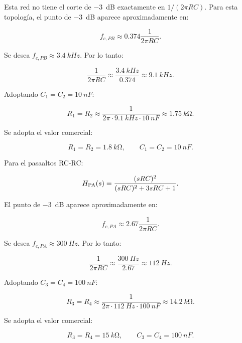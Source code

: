 Esta red no tiene el corte de \SI{-3}{dB} exactamente en $1/(2\pi RC)$. Para esta topología, el punto de \SI{-3}{dB} aparece aproximadamente en:

\begin{equation}
    f_{c,PB}\approx 0.374\frac{1}{2\pi RC}.
\end{equation}

Se desea $f_{c,PB}\approx\SI{3.4}{kHz}$. Por lo tanto:

\begin{equation}
    \frac{1}{2\pi RC}\approx\frac{\SI{3.4}{kHz}}{0.374}\approx\SI{9.1}{kHz}.
\end{equation}

Adoptando $C_1=C_2=\SI{10}{nF}$:

\begin{equation}
    R_1=R_2\approx\frac{1}{2\pi\cdot \SI{9.1}{kHz}\cdot \SI{10}{nF}}\approx\SI{1.75}{k\ohm}.
\end{equation}

Se adopta el valor comercial:

\begin{equation}
    \boxed{R_1=R_2=\SI{1.8}{k\ohm}},
    \qquad
    \boxed{C_1=C_2=\SI{10}{nF}}.
\end{equation}

Para el pasaaltos RC-RC:

\begin{equation}
    H_{\mathrm{PA}}(s)=\frac{(sRC)^2}{(sRC)^2+3sRC+1}.
\end{equation}

El punto de \SI{-3}{dB} aparece aproximadamente en:

\begin{equation}
    f_{c,PA}\approx 2.67\frac{1}{2\pi RC}.
\end{equation}

Se desea $f_{c,PA}\approx\SI{300}{Hz}$. Por lo tanto:

\begin{equation}
    \frac{1}{2\pi RC}\approx\frac{\SI{300}{Hz}}{2.67}\approx\SI{112}{Hz}.
\end{equation}

Adoptando $C_3=C_4=\SI{100}{nF}$:

\begin{equation}
    R_3=R_4\approx\frac{1}{2\pi\cdot\SI{112}{Hz}\cdot\SI{100}{nF}}\approx\SI{14.2}{k\ohm}.
\end{equation}

Se adopta el valor comercial:

\begin{equation}
    \boxed{R_3=R_4=\SI{15}{k\ohm}},
    \qquad
    \boxed{C_3=C_4=\SI{100}{nF}}.
\end{equation}

